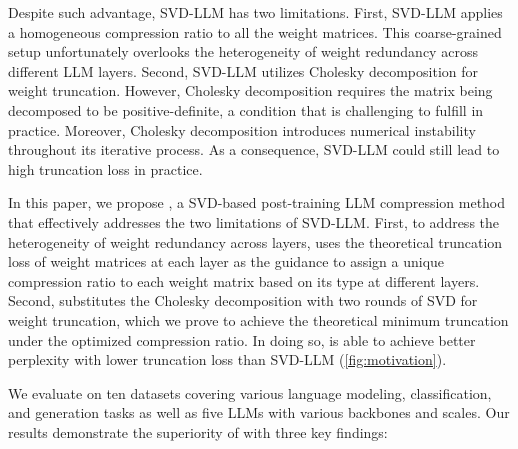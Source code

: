 %
Despite such advantage, SVD-LLM has two limitations.
%
First, SVD-LLM applies a homogeneous compression ratio to all the weight matrices. This coarse-grained setup unfortunately overlooks the heterogeneity of weight redundancy across different LLM layers. 
%
Second, SVD-LLM utilizes Cholesky decomposition for weight truncation. However, Cholesky decomposition requires the matrix being decomposed to be positive-definite, a condition that is challenging to fulfill in practice. Moreover, Cholesky decomposition introduces numerical instability throughout its iterative process. 
%
As a consequence, SVD-LLM
could still lead to high truncation loss in practice.
%

In this paper, we propose \sysname, a SVD-based post-training LLM compression method that effectively addresses the two limitations of SVD-LLM.
%
First, to address the heterogeneity of weight redundancy across layers, \sysname uses the theoretical truncation loss of
weight matrices at each layer as the guidance to assign a unique compression
ratio to each weight matrix based on its type at different layers.
Second, \sysname substitutes the Cholesky decomposition with two rounds of SVD for weight truncation, which we prove to achieve the theoretical minimum truncation under the optimized compression ratio.
%
In doing so, \sysname is able to achieve better perplexity with lower truncation loss than SVD-LLM (\cref{fig:motivation}).


We evaluate \sysname on ten datasets covering various language modeling, classification, and generation tasks as well as five LLMs with various backbones and scales. Our results demonstrate the superiority of \sysname with three key findings:


